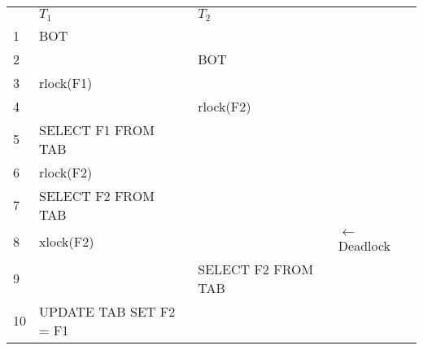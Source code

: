\documentclass{bschlangaul-aufgabe}
\begin{document}
\begin{enumerate}
\begin{bAntwort}
\begin{tabular}{|l|l|l|l}
   & $T_1$                  & $T_2$              &          \\
1  & BOT                    &                    &          \\
2  &                        & BOT                &          \\
3  & rlock(F1)              &                    &          \\
4  &                        & rlock(F2)          &          \\
5  & SELECT F1 FROM TAB     &                    &          \\
6  & rlock(F2)              &                    &          \\
7  & SELECT F2 FROM TAB     &                    &          \\
8  & xlock(F2)              &                    & $\leftarrow$ Deadlock \\
9  &                        & SELECT F2 FROM TAB &          \\
10 & UPDATE TAB SET F2 = F1 &                    &          \\
\end{tabular}
\end{bAntwort}
\end{enumerate}
\end{document}
